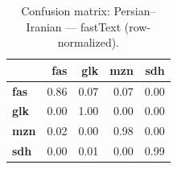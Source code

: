 \begin{table}[htbp]
\centering
\small
\begin{tabular}{lrrrr}
\toprule
 & \textbf{fas} & \textbf{glk} & \textbf{mzn} & \textbf{sdh} \\
\midrule
\textbf{fas} & \cellcolor{blue!85}\color{white}0.86 & \cellcolor{blue!6}0.07 & \cellcolor{blue!7}0.07 & \cellcolor{blue!0}0.00 \\
\textbf{glk} & \cellcolor{blue!0}0.00 & \cellcolor{blue!100}\color{white}1.00 & \cellcolor{blue!0}0.00 & \cellcolor{blue!0}0.00 \\
\textbf{mzn} & \cellcolor{blue!1}0.02 & \cellcolor{blue!0}0.00 & \cellcolor{blue!98}\color{white}0.98 & \cellcolor{blue!0}0.00 \\
\textbf{sdh} & \cellcolor{blue!0}0.00 & \cellcolor{blue!0}0.01 & \cellcolor{blue!0}0.00 & \cellcolor{blue!99}\color{white}0.99 \\
\bottomrule
\end{tabular}
\caption{Confusion matrix: Persian--Iranian — fastText (row-normalized).}
\label{tab:cm-persian_iranian-fasttext}
\end{table}